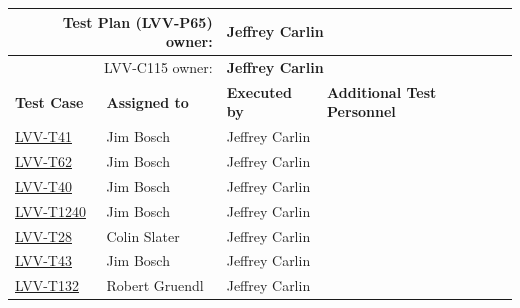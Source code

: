 \documentclass[DM,STR,toc]{lsstdoc}
\begin{document}
\begin{longtable}{p{3cm}p{3cm}p{3cm}p{6cm}}
\hline
\multicolumn{2}{r}{Test Plan (LVV-P65) owner:} &
\multicolumn{2}{l}{\textbf{ Jeffrey Carlin } }\\\hline
\multicolumn{2}{r}{ LVV-C115 owner:} &
\multicolumn{2}{l}{\textbf{
    Jeffrey Carlin
}
} \\\hline
\textbf{Test Case} & \textbf{Assigned to} & \textbf{Executed by} & \textbf{Additional Test Personnel} \\ \hline
\href{https://jira.lsstcorp.org/secure/Tests.jspa#/testCase/LVV-T41}{LVV-T41}
& {\small Jim Bosch } & {\small Jeffrey Carlin } &
\begin{minipage}[]{6cm}
\smallskip
{\small  }
\medskip
\end{minipage}
\\ \hline
\href{https://jira.lsstcorp.org/secure/Tests.jspa#/testCase/LVV-T62}{LVV-T62}
& {\small Jim Bosch } & {\small Jeffrey Carlin } &
\begin{minipage}[]{6cm}
\smallskip
{\small  }
\medskip
\end{minipage}
\\ \hline
\href{https://jira.lsstcorp.org/secure/Tests.jspa#/testCase/LVV-T40}{LVV-T40}
& {\small Jim Bosch } & {\small Jeffrey Carlin } &
\begin{minipage}[]{6cm}
\smallskip
{\small  }
\medskip
\end{minipage}
\\ \hline
\href{https://jira.lsstcorp.org/secure/Tests.jspa#/testCase/LVV-T1240}{LVV-T1240}
& {\small Jim Bosch } & {\small Jeffrey Carlin } &
\begin{minipage}[]{6cm}
\smallskip
{\small  }
\medskip
\end{minipage}
\\ \hline
\href{https://jira.lsstcorp.org/secure/Tests.jspa#/testCase/LVV-T28}{LVV-T28}
& {\small Colin Slater } & {\small Jeffrey Carlin } &
\begin{minipage}[]{6cm}
\smallskip
{\small  }
\medskip
\end{minipage}
\\ \hline
\href{https://jira.lsstcorp.org/secure/Tests.jspa#/testCase/LVV-T43}{LVV-T43}
& {\small Jim Bosch } & {\small Jeffrey Carlin } &
\begin{minipage}[]{6cm}
\smallskip
{\small  }
\medskip
\end{minipage}
\\ \hline
\href{https://jira.lsstcorp.org/secure/Tests.jspa#/testCase/LVV-T132}{LVV-T132}
& {\small Robert Gruendl } & {\small Jeffrey Carlin } &

\end{longtable}
\end{document}
